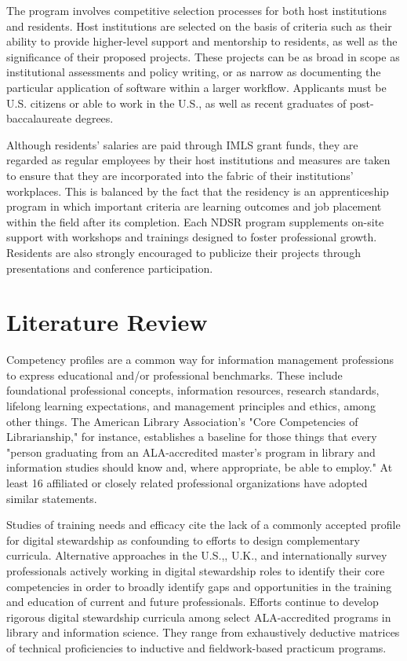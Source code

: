\documentclass{acm_proc_article-sp}
\begin{document}
The program involves competitive selection processes for both host institutions and residents. Host institutions are selected on the basis of criteria such as their ability to provide higher-level support and mentorship to residents, as well as the significance of their proposed projects. These projects can be as broad in scope as institutional assessments and policy writing, or as narrow as documenting the particular application of software within a larger workflow. Applicants must be U.S. citizens or able to work in the U.S., as well as recent graduates of post-baccalaureate degrees. 

Although residents' salaries are paid through IMLS grant funds, they are regarded as regular employees by their host institutions and measures are taken to ensure that they are incorporated into the fabric of their institutions' workplaces. This is balanced by the fact that the residency is an apprenticeship program in which important criteria are learning outcomes and job placement within the field after its completion. Each NDSR program supplements on-site support with workshops and trainings designed to foster professional growth. Residents are also strongly encouraged to publicize their projects through presentations and conference participation. 

\section{Literature Review}
Competency profiles are a common way for information management professions to express educational and/or professional benchmarks. These include foundational professional concepts, information resources, research standards, lifelong learning expectations, and management principles and ethics, among other things. The American Library Association's "Core Competencies of Librarianship," for instance, establishes a baseline for those things that every "person graduating from an ALA-accredited master's program in library and information studies should know and, where appropriate, be able to employ."\cite{4} At least 16 affiliated or closely related professional organizations have adopted similar statements. \cite{5}

Studies of training needs and efficacy \cite{6, 7, 8} cite the lack of a commonly accepted profile for digital stewardship as confounding to efforts to design complementary curricula. Alternative approaches in the U.S.,\cite{9, 10}, U.K.\cite{11}, and internationally\cite{12, 13} survey professionals actively working in digital stewardship roles to identify their core competencies in order to broadly identify gaps and opportunities in the training and education of current and future professionals. Efforts continue to develop rigorous digital stewardship curricula among select ALA-accredited programs in library and information science. They range from exhaustively deductive matrices of technical proficiencies\cite{14} to inductive and fieldwork-based practicum programs.\cite{15}
\end{document}

